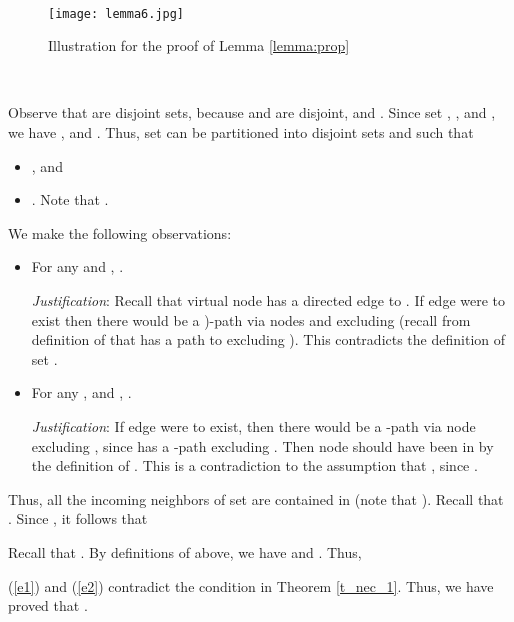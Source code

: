 \documentclass[letterpaper, 11pt]{article}
\newenvironment{proof}{\noindent {\bf Proof:}~}{\hspace*{\fill}}
\begin{document}
\begin{proof}
\begin{figure}[tbhp]
\centering
\texttt{[image: lemma6.jpg]}
\caption{Illustration for the proof of Lemma \ref{lemma:prop}}
\label{fig:lemma6}
\end{figure}

~


Observe that  are disjoint sets, because  and  are disjoint, and
.
Since set , , and ,
we have
, and .
Thus, set  can be partitioned into disjoint sets  and 
such that
\begin{itemize}
\item , and
\item . Note that .
\end{itemize}
We make the following observations:
\begin{itemize}
\item For any  and , .

	{\em Justification}:
	Recall that virtual node  has a directed edge to .
	If edge  were to exist then there would be a )-path
	via nodes  and  excluding 
	(recall from definition of  that  has
	a path to  excluding ).
	This contradicts the definition of set .
\item For any , and , .
	
	{\em Justification}:
	If edge  were to exist, then there would be a -path
	via node  excluding ,
        since  has a -path excluding .
	Then node  should have been in  by the definition of .
	This is a contradiction to the assumption that , since
	.
\end{itemize}
Thus, all the incoming neighbors of set  are contained in  (note that
).
Recall that .
Since , it follows that


Recall that .
By definitions of  above, we have  and .
Thus,

(\ref{e1}) and (\ref{e2}) contradict the condition in Theorem \ref{t_nec_1}.
Thus, we have proved that
.
\end{proof}
\end{document}

